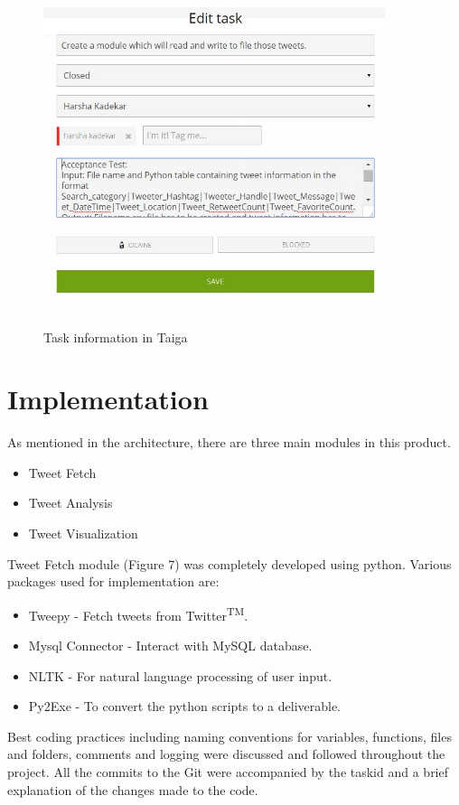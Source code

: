 \documentclass[11pt]{article}
\begin{document}
\begin{figure}[!ht]
\centering
\includegraphics[width=10cm, height=10cm]{TaskInfo.jpg}
\caption{Task information in Taiga\cite{TaigaSite} }
\end{figure}


\section{Implementation}
As mentioned in the architecture, there are three main modules in this product.
\begin{itemize}
\item Tweet Fetch
\item Tweet Analysis
\item Tweet Visualization
\end{itemize}

Tweet Fetch module (Figure 7) was completely developed using python. Various packages used for implementation are:
\begin{itemize}
\item Tweepy - Fetch tweets from Twitter\textsuperscript{TM}.
\item Mysql Connector - Interact with MySQL database.
\item NLTK - For natural language processing of user input.
\item Py2Exe - To convert the python scripts to a deliverable.
\end{itemize}

Best coding practices including naming conventions for variables, functions, files and folders, comments and logging were discussed and followed throughout the project. All the commits to the Git were accompanied by the taskid and a brief explanation of the changes made to the code.
\end{document}
